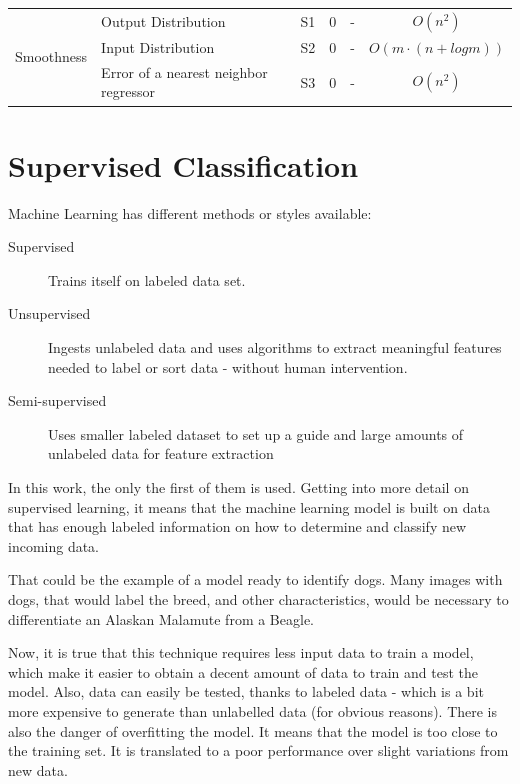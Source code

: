 \begin{center}
\begin{scriptsize}
\begin{longtable}{ | r | l | l | c | c | c | }
\multirow{3}{*}{Smoothness} & Output Distribution & 
S1 & 0 & - & $O(n^2)$ \\
\cline{2-6}
& Input Distribution &
S2 & 0 & - & $O(m \cdot (n + log m))$ \\
\cline{2-6}
& Error of a nearest neighbor regressor &
S3 & 0 & - & $O(n^2)$ \\
\hline

\end{longtable}
\end{scriptsize}
\end{center}

\section{Supervised Classification}

Machine Learning has different methods or styles available:

\begin{description}
    \item [Supervised] Trains itself on labeled data set.
    \item [Unsupervised] Ingests unlabeled data and uses algorithms to extract 
    meaningful features needed to label or sort data - without human
    intervention.
    \item [Semi-supervised] Uses smaller labeled dataset to set up a guide and 
    large amounts of unlabeled data for feature extraction
\end{description}

In this work, the only the first of them is used. Getting into more detail on
supervised learning, it means that the machine learning model is built on
data that has enough labeled information on how to determine and classify new
incoming data.

That could be the example of a model ready to identify dogs. Many images with 
dogs, that would label the breed, and other characteristics, would be necessary 
to differentiate an Alaskan Malamute from a Beagle.

Now, it is true that this technique requires less input data to train a model,
which make it easier to obtain a decent amount of data to train and test the
model. Also, data can easily be tested, thanks to labeled data - which is a bit
more expensive to generate than unlabelled data (for obvious reasons). There is
also the danger of overfitting the model. It means that the model is too close
to the training set. It is translated to a poor performance over slight 
variations from new data.

